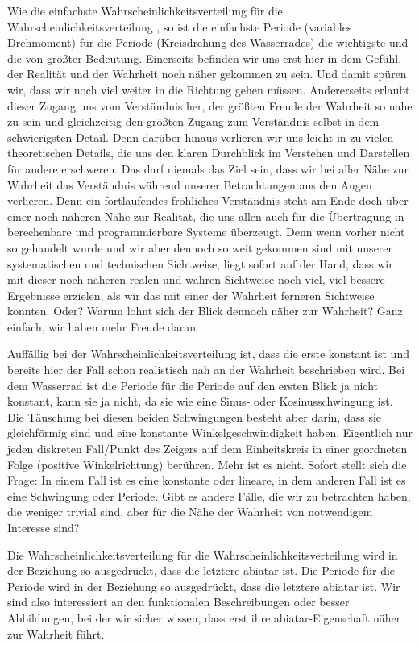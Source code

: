 \documentclass[a4paper,12pt]{article}
\theoremstyle{definition}
\begin{document}
Wie die einfachste Wahrscheinlichkeitsverteilung für die Wahrscheinlichkeitsverteilung \cite{epp2026sat}, so ist die einfachste Periode (variables Drehmoment) für die Periode (Kreisdrehung des Wasserrades) die wichtigste und die von größter Bedeutung. Einerseits befinden wir uns erst hier in dem Gefühl, der Realität und der Wahrheit noch näher gekommen zu sein. Und damit spüren wir, dass wir noch viel weiter in die Richtung gehen müssen. Andererseits erlaubt dieser Zugang uns vom Verständnis her, der größten Freude der Wahrheit so nahe zu sein und gleichzeitig den größten Zugang zum Verständnis selbst in dem schwierigsten Detail. Denn darüber hinaus verlieren wir uns leicht in zu vielen theoretischen Details, die uns den klaren Durchblick im Verstehen und Darstellen für andere erschweren. Das darf niemals das Ziel sein, dass wir bei aller Nähe zur Wahrheit das Verständnis während unserer Betrachtungen aus den Augen verlieren. Denn ein fortlaufendes fröhliches Verständnis steht am Ende doch über einer noch näheren Nähe zur Realität, die uns allen auch für die Übertragung in berechenbare und programmierbare Systeme überzeugt. Denn wenn vorher nicht so gehandelt wurde und wir aber dennoch so weit gekommen sind mit unserer systematischen und technischen Sichtweise, liegt sofort auf der Hand, dass wir mit dieser noch näheren realen und wahren Sichtweise noch viel, viel bessere Ergebnisse erzielen, als wir das mit einer der Wahrheit ferneren Sichtweise konnten. Oder? Warum lohnt sich der Blick dennoch näher zur Wahrheit? Ganz einfach, wir haben mehr Freude daran.

Auffällig bei der Wahrscheinlichkeitsverteilung ist, dass die erste konstant ist und bereits hier der Fall schon realistisch nah an der Wahrheit beschrieben wird. Bei dem Wasserrad ist die Periode für die Periode auf den ersten Blick ja nicht konstant, kann sie ja nicht, da sie wie eine Sinus- oder Kosinusschwingung ist. Die Täuschung bei diesen beiden Schwingungen besteht aber darin, dass sie gleichförmig sind und eine konstante Winkelgeschwindigkeit haben. Eigentlich nur jeden diskreten Fall/Punkt des Zeigers auf dem Einheitskreis in einer geordneten Folge (positive Winkelrichtung) berühren. Mehr ist es nicht. Sofort stellt sich die Frage: In einem Fall ist es eine konstante oder lineare, in dem anderen Fall ist es eine Schwingung oder Periode. Gibt es andere Fälle, die wir zu betrachten haben, die weniger trivial sind, aber für die Nähe der Wahrheit von notwendigem Interesse sind?

Die Wahrscheinlichkeitsverteilung für die Wahrscheinlichkeitsverteilung wird in der Beziehung so ausgedrückt, dass die letztere abiatar ist. Die Periode für die Periode wird in der Beziehung so ausgedrückt, dass die letztere abiatar ist. Wir sind also interessiert an den funktionalen Beschreibungen oder besser Abbildungen, bei der wir sicher wissen, dass erst ihre abiatar-Eigenschaft näher zur Wahrheit führt.
\end{document}
